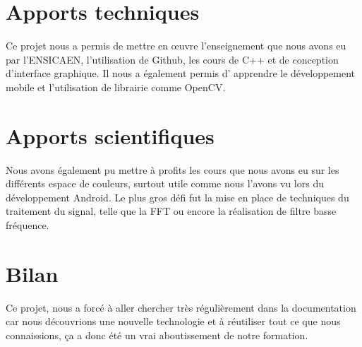 \section{Apports techniques}

Ce projet nous a permis de mettre en œuvre l'enseignement que nous avons eu par l'ENSICAEN, l'utilisation de Github, les cours de C++ et de conception d'interface graphique. Il nous a également permis d'
apprendre le développement mobile et l'utilisation de librairie comme OpenCV. 

\section{Apports scientifiques}

Nous avons également pu mettre à profits les cours que nous avons eu sur les différents espace de couleurs, surtout utile comme nous l'avons vu lors du développement Android. Le plus gros défi fut la mise
en place de techniques du traitement du signal, telle que la FFT ou encore la réalisation de filtre basse fréquence. 

\section{Bilan}

Ce projet, nous a forcé à aller chercher très régulièrement dans la documentation car nous découvrions une nouvelle technologie et à réutiliser tout ce que nous connaissions, ça a donc été un vrai 
aboutissement de notre formation.
